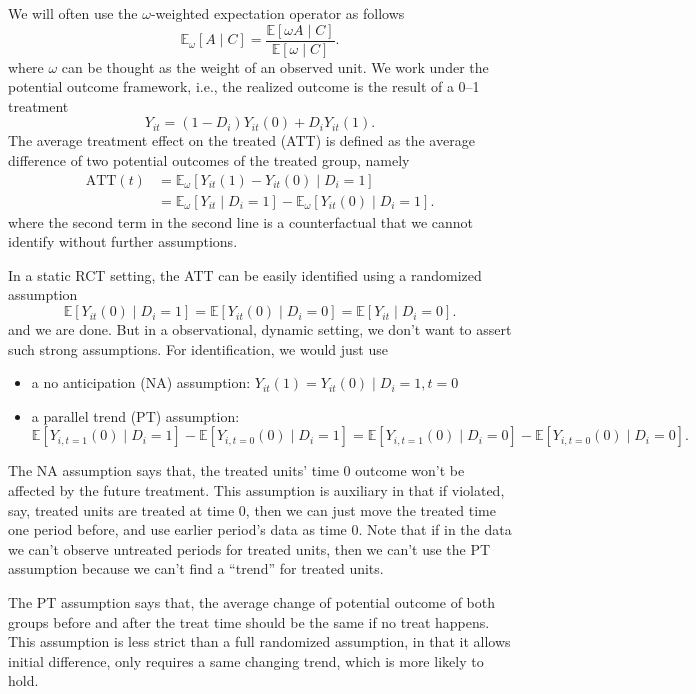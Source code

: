 \documentclass[12pt]{article}
\begin{document}
We will often use the \( \omega  \)-weighted expectation operator as follows
\[
  \mathbb{E}_{\omega} [A \mid C]= \frac{\mathbb{E}[\omega A \mid C]}{\mathbb{E}[\omega \mid C]}
.\]
where \( \omega \) can be thought as the weight of an observed unit.
We work under the potential outcome
framework, i.e., the realized outcome is the result of a 0--1 treatment
\[
  Y_{it}=(1-D_{i})Y_{it}(0) + D_{i} Y_{it}(1)
.\]
The average treatment effect on the treated (ATT) is defined as the average difference of two
potential outcomes of the treated group, namely
\begin{align*}
  \text{ATT}(t) &= \mathbb{E}_{\omega}[Y_{it}(1)-Y_{it}(0) \mid D_i=1] \\
  &= \mathbb{E}_{\omega}[Y_{it} \mid D_i=1] - \mathbb{E}_{\omega}[Y_{it}(0) \mid D_{i}=1]
  .
\end{align*}
where the second term in the second line is a counterfactual that we cannot identify
without further assumptions.

In a static RCT setting, the ATT can be easily identified using a randomized assumption
\[
  \mathbb{E}[Y_{it}(0) \mid D_i=1] = \mathbb{E}[Y_{it}(0) \mid D_i=0] = \mathbb{E}[Y_{it}
  \mid D_i=0]
.\]
and we are done. But in a observational, dynamic setting, we don't want to assert such
strong assumptions.
For identification, we would just use
\begin{itemize}
  \item a no anticipation (NA) assumption: \( Y_{it}(1)=Y_{it}(0) \mid D_{i}=1,t=0 \)
  \item a parallel trend (PT) assumption:
    \[
      \mathbb{E}[Y_{i,t=1}(0) \mid D_i=1] - \mathbb{E}[Y_{i,t=0}(0) \mid D_i=1] =
      \mathbb{E}[Y_{i,t=1}(0) \mid D_i=0] - \mathbb{E}[Y_{i,t=0}(0) \mid D_i=0]
    .\]
\end{itemize}
The NA assumption says that, the treated units' time 0 outcome won't be affected by the
future treatment.
This assumption is auxiliary in that if violated, say, treated units are treated at time 0, then
we can just move the treated time one period before, and use earlier period's data as time 0.
Note that if in the data we can't observe untreated periods for treated units, then we
can't use the PT assumption because we can't find a ``trend'' for treated units.

The PT assumption says that, the average change of potential outcome of both groups
before and after the treat time
should be the same if no treat happens. This assumption is less strict than a full
randomized assumption,
in that it allows initial difference, only requires a same changing trend, which is more
likely to hold.
\end{document}
